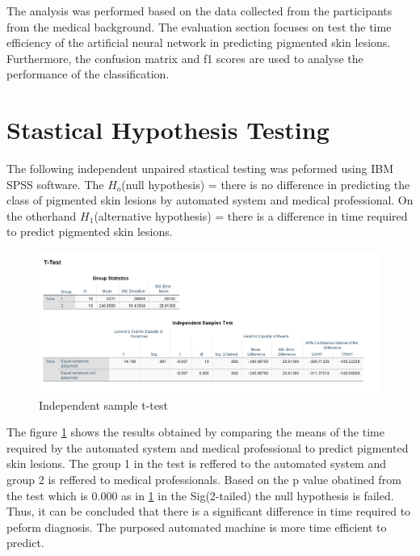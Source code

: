 The analysis was performed based on the data collected from the participants from the medical background. 
The evaluation section focuses on test the time efficiency of the artificial neural network in predicting pigmented skin lesions. Furthermore, the confusion matrix and f1 scores are used to analyse the performance of the classification.

\section{Stastical Hypothesis Testing}
The following independent unpaired stastical testing was peformed using 
IBM SPSS software. The ${H_o}$(null hypothesis) = there is no difference in 
predicting the class of pigmented skin lesions by automated system and 
medical professional. On the otherhand ${H_1}$(alternative hypothesis) = there is 
a difference in time required to predict pigmented skin lesions.
\begin{figure}[!htp]
    \includegraphics[width=14cm]{Images/ttest.png}
    \caption{Independent sample t-test}
    \label{fig:istt}
\end{figure}
\pagebreak

The figure \ref{fig:istt} shows the results obtained by comparing the 
means of the time required by the automated system and medical professional to predict pigmented skin 
lesions. The group 1 in the test is reffered to the automated system and 
group 2 is reffered to medical professionals. Based on the p value obatined from the 
test which is 0.000 as in \ref{fig:istt} in the Sig(2-tailed) the null 
hypothesis is failed. Thus, it can be concluded that there is a significant 
difference in time required to peform diagnosis. The purposed automated machine 
is more time efficient to predict.

